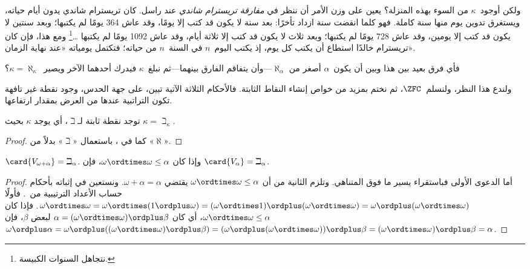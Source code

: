 \documentclass[../../../include/open-logic-section]{subfiles}
\begin{document}
ولكن أوجود~$\kappa$ من السوء بهذه المنزلة؟ يعين على وزن الأمر أن ننظر
في \emph{مفارقة تريسترام شاندي} عند راسل. كان تريسترام شاندي يدون أيام
حياته، ويستغرق تدوين يوم منها سنة كاملة. فهو كلما انقضت سنة ازداد
تأخرًا: بعد سنة لا يكون قد كتب إلا يومًا، وقد عاش 364 يومًا لم يكتبها؛
وبعد سنتين لا يكون قد كتب إلا يومين، وقد عاش 728 يومًا لم يكتبها؛ وبعد
ثلاث لا يكون قد كتب إلا ثلاثة أيام، وقد عاش 1092 يومًا لم يكتبها
\dots\footnote{نتجاهل السنوات الكبيسة.} ومع هذا، فإن كان تريسترام
خالدًا استطاع أن يكتب كل يوم، إذ يكتب اليوم~$n$ في السنة~$n$ من حياته؛
فتكتمل يومياته «عند نهاية الزمان».

فأي فرق بعيد بين هذا وبين أن يكون~$\alpha$ أصغر من
$\aleph_\alpha$---وأن يتفاقم الفارق بينهما---ثم نبلغ~$\kappa$ فيدرك
أحدهما الآخر ويصير~$\kappa = \aleph_\kappa$؟

ولندع هذا النظر، ولنسلم~$\ZFC$، ثم نختم بمزيد من خواص إنشاء النقاط
الثابتة. فالأحكام الثلاثة الآتية تبين، على جهة الحدس، وجود نقطة غير
تافهة تكون التراتبية عندها من العرض بمقدار ارتفاعها.

\begin{prop}
توجد نقطة ثابتة لـ$\beth$، أي يوجد $\kappa$ بحيث
$\kappa= \beth_\kappa$.
\end{prop}

\begin{proof}
كما في ، باستعمال «$\beth$» بدلاً من «$\aleph$».
\end{proof}

\begin{prop}
$\card{V_{\omega+\alpha}} = \beth_{\alpha}$. وإذا كان
$\omega \ordtimes \omega \leq \alpha$، فإن
$\card{V_\alpha} = \beth_\alpha$.
\end{prop}

\begin{proof}
أما الدعوى الأولى فباستقراء يسير ما فوق المتناهي. وتلزم الثانية من أن
$\omega \ordtimes \omega \leq \alpha$ يقتضي
$\omega + \alpha = \alpha$. ونستعين في إثباته بأحكام حساب الأعداد
الترتيبية من~. فأولًا
$\omega \ordtimes \omega = \omega \ordtimes (1 \ordplus \omega) =
(\omega \ordtimes 1) \ordplus (\omega\ordtimes\omega) = \omega
\ordplus (\omega \ordtimes \omega)$. فإذا كان
$\omega \ordtimes \omega \leq \alpha$، أي كان
$\alpha = (\omega\ordtimes\omega) \ordplus \beta$ لبعض $\beta$، فإن
$\omega \ordplus \alpha = \omega \ordplus
((\omega \ordtimes \omega) \ordplus \beta) =
(\omega \ordplus (\omega \ordtimes \omega)) \ordplus \beta =
(\omega \ordtimes \omega) \ordplus \beta = \alpha$.
\end{proof}
\end{document}
